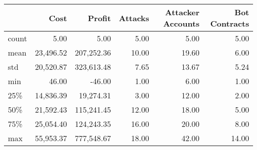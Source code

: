 \begin{tabular}{lrrrrr}
\toprule
{} &      Cost &     Profit & Attacks & Attacker Accounts & Bot Contracts \\
\midrule
count &      5.00 &       5.00 &    5.00 &              5.00 &          5.00 \\
mean  & 23,496.52 & 207,252.36 &   10.00 &             19.60 &          6.00 \\
std   & 20,520.87 & 323,613.48 &    7.65 &             13.67 &          5.24 \\
min   &     46.00 &     -46.00 &    1.00 &              6.00 &          1.00 \\
25\%   & 14,836.39 &  19,274.31 &    3.00 &             12.00 &          2.00 \\
50\%   & 21,592.43 & 115,241.45 &   12.00 &             18.00 &          5.00 \\
75\%   & 25,054.40 & 124,243.35 &   16.00 &             20.00 &          8.00 \\
max   & 55,953.37 & 777,548.67 &   18.00 &             42.00 &         14.00 \\
\bottomrule
\end{tabular}

